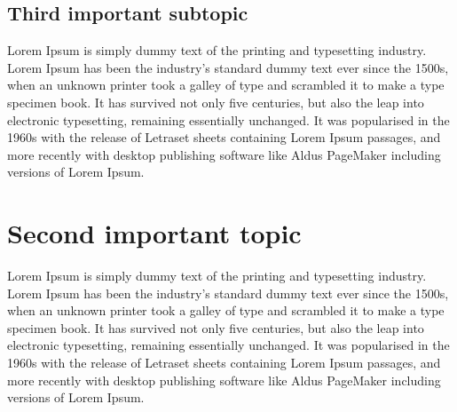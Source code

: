 \documentclass{kthreport}
\begin{document}
\subsection{Third important subtopic}
Lorem Ipsum is simply dummy text of the printing and typesetting industry. Lorem Ipsum has been the industry's standard dummy text ever since the 1500s, when an unknown printer took a galley of type and scrambled it to make a type specimen book. It has survived not only five centuries, but also the leap into electronic typesetting, remaining essentially unchanged. It was popularised in the 1960s with the release of Letraset sheets containing Lorem Ipsum passages, and more recently with desktop publishing software like Aldus PageMaker including versions of Lorem Ipsum.
\section{Second important topic}
Lorem Ipsum is simply dummy text of the printing and typesetting industry. Lorem Ipsum has been the industry's standard dummy text ever since the 1500s, when an unknown printer took a galley of type and scrambled it to make a type specimen book. It has survived not only five centuries, but also the leap into electronic typesetting, remaining essentially unchanged. It was popularised in the 1960s with the release of Letraset sheets containing Lorem Ipsum passages, and more recently with desktop publishing software like Aldus PageMaker including versions of Lorem Ipsum.






\end{document}
